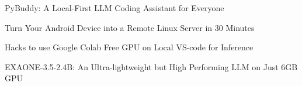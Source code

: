

\begin{cvlistsection}
\item PyBuddy: A Local-First LLM Coding Assistant for Everyone
\href{https://taufiq.cc/blog/pybuddy-local-ai-code-assistant.html}{\faLink}

\item Turn Your Android Device into a Remote Linux Server in 30 Minutes
\href{https://taufiq.cc/blog/turn-android-device-into-remote-linux-server-in-30-minutes.html}{\faLink}

\item Hacks to use Google Colab Free GPU on Local VS-code for Inference
\href{https://taufiq.cc/blog/google-colab-free-gpu-on-local-device-for-inference.html}{\faLink}

\item EXAONE-3.5-2.4B: An Ultra-lightweight but High Performing LLM on Just 6GB GPU
\href{https://taufiq.cc/blog/exaone-3-5-2-4b-pre-trained.html}{\faLink}
\end{cvlistsection}

